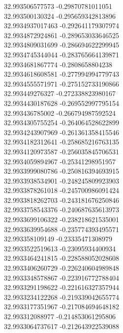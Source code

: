 {32.993506577573	-0.29870781011051\\
32.993500130324	-0.295659342813896\\
32.9934937017463	-0.292641179307974\\
32.9934872924861	-0.289653033646525\\
32.9934809031699	-0.286694622299945\\
32.9934745344044	-0.283765664139871\\
32.9934681867774	-0.2808658804238\\
32.9934618608581	-0.277994994779743\\
32.9934555571971	-0.275152733190866\\
32.993449276327	-0.272338823980167\\
32.9934430187628	-0.269552997795154\\
32.993436785002	-0.266794987592524\\
32.9934305755254	-0.264064528622899\\
32.9934243907969	-0.261361358415546\\
32.9934182312641	-0.258685216763135\\
32.9934120973587	-0.256035845706531\\
32.9934059894967	-0.25341298951957\\
32.9933999080786	-0.250816394693915\\
32.9933938534901	-0.248245809923903\\
32.9933878261018	-0.245700986091424\\
32.9933818262703	-0.243181676250846\\
32.9933758543376	-0.240687635613973\\
32.9933699106322	-0.238218621535001\\
32.9933639954688	-0.235774393495571\\
32.993358109149	-0.23335471308979\\
32.9933522519613	-0.23095934400934\\
32.9933464241815	-0.228588052028608\\
32.9933406260729	-0.226240604989848\\
32.9933348578867	-0.223916772788404\\
32.9933291198622	-0.221616327357944\\
32.9933234122268	-0.219339042655774\\
32.9933177351967	-0.217084694648182\\
32.993312088977	-0.214853061295806\\
32.9933064737617	-0.212643922539088\\
}
